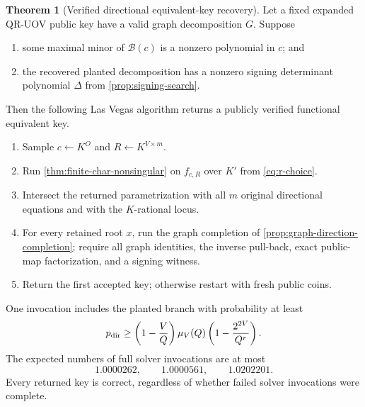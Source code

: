 \documentclass[11pt,a4paper]{article}
\theoremstyle{definition}
\newtheorem{theorem}{Theorem}[section]
\theoremstyle{remark}
\newcommand{\QRUOV}{\textsf{QR-UOV}}
\begin{document}
\begin{theorem}[Verified directional equivalent-key recovery]\label{thm:verified-directional-recovery}
Let a fixed expanded \QRUOV{} public key have a valid graph decomposition $G$.  Suppose
\begin{enumerate}
\item some maximal minor of $\mathcal B(c)$ is a nonzero polynomial in $c$; and
\item the recovered planted decomposition has a nonzero signing determinant polynomial $\Delta$ from \cref{prop:signing-search}.
\end{enumerate}
Then the following Las Vegas algorithm returns a publicly verified functional equivalent key.

\begin{enumerate}
\item Sample $c\leftarrow K^O$ and $R\leftarrow K^{V\times m}$.
\item Run \cref{thm:finite-char-nonsingular} on $f_{c,R}$ over $K'$ from \eqref{eq:r-choice}.
\item Intersect the returned parametrization with all $m$ original directional equations and with the $K$-rational locus.
\item For every retained root $x$, run the graph completion of \cref{prop:graph-direction-completion}; require all graph identities, the inverse pull-back, exact public-map factorization, and a signing witness.
\item Return the first accepted key; otherwise restart with fresh public coins.
\end{enumerate}

One invocation includes the planted branch with probability at least
\begin{equation}\label{eq:directional-invocation-success}
 p_{\rm dir}
 \ge
 \left(1-\frac VQ\right)
 \mu_V(Q)
 \left(1-\frac{2^{2V}}{Q^r}\right).
\end{equation}
The expected numbers of full solver invocations are at most
\begin{equation}\label{eq:directional-restart-values}
 1.0000262,
 \qquad1.0000561,
 \qquad1.0202201.
\end{equation}
Every returned key is correct, regardless of whether failed solver invocations were complete.
\end{theorem}
\end{document}

